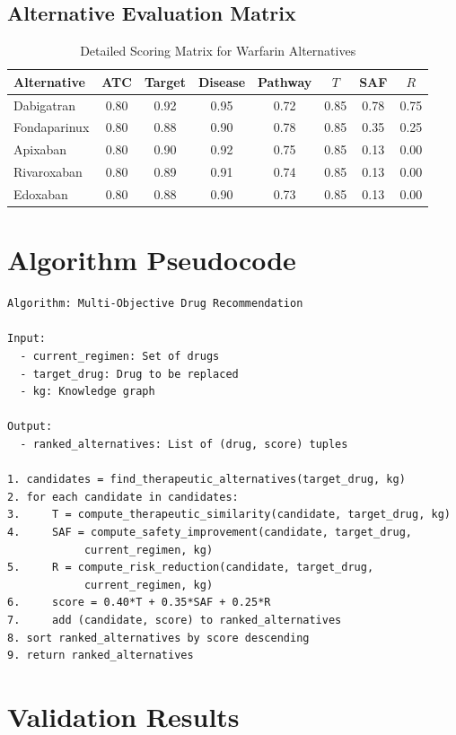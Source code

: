 \documentclass[11pt,a4paper]{article}
\begin{document}
\subsection{Alternative Evaluation Matrix}

\begin{table}[H]
\centering
\caption{Detailed Scoring Matrix for Warfarin Alternatives}
\label{tab:detailed_scoring}
\begin{tabular}{@{}lccccccc@{}}
\toprule
\textbf{Alternative} & \textbf{ATC} & \textbf{Target} & \textbf{Disease} & \textbf{Pathway} & \textbf{$T$} & \textbf{SAF} & \textbf{$R$} \\
\midrule
Dabigatran & 0.80 & 0.92 & 0.95 & 0.72 & 0.85 & 0.78 & 0.75 \\
Fondaparinux & 0.80 & 0.88 & 0.90 & 0.78 & 0.85 & 0.35 & 0.25 \\
Apixaban & 0.80 & 0.90 & 0.92 & 0.75 & 0.85 & 0.13 & 0.00 \\
Rivaroxaban & 0.80 & 0.89 & 0.91 & 0.74 & 0.85 & 0.13 & 0.00 \\
Edoxaban & 0.80 & 0.88 & 0.90 & 0.73 & 0.85 & 0.13 & 0.00 \\
\bottomrule
\end{tabular}
\end{table}

\section{Algorithm Pseudocode}

\begin{verbatim}
Algorithm: Multi-Objective Drug Recommendation

Input: 
  - current_regimen: Set of drugs
  - target_drug: Drug to be replaced
  - kg: Knowledge graph

Output:
  - ranked_alternatives: List of (drug, score) tuples

1. candidates = find_therapeutic_alternatives(target_drug, kg)
2. for each candidate in candidates:
3.     T = compute_therapeutic_similarity(candidate, target_drug, kg)
4.     SAF = compute_safety_improvement(candidate, target_drug, 
            current_regimen, kg)
5.     R = compute_risk_reduction(candidate, target_drug, 
            current_regimen, kg)
6.     score = 0.40*T + 0.35*SAF + 0.25*R
7.     add (candidate, score) to ranked_alternatives
8. sort ranked_alternatives by score descending
9. return ranked_alternatives
\end{verbatim}

\section{Validation Results}
\end{document}
